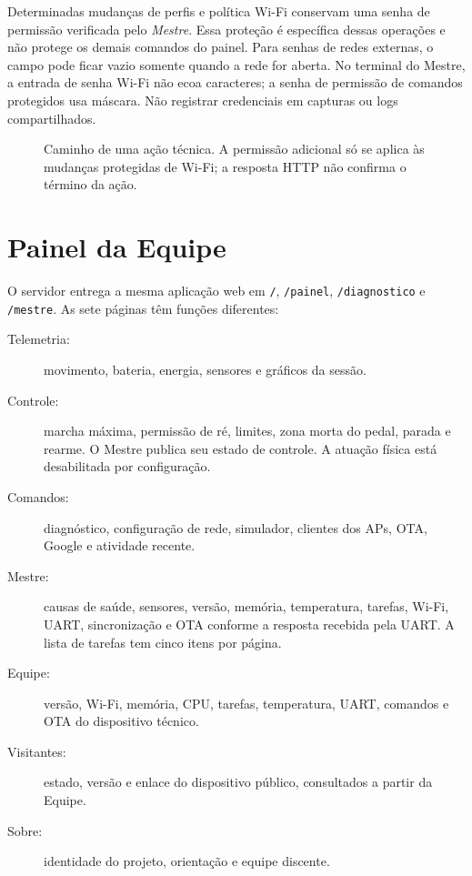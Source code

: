 Determinadas mudanças de perfis e política Wi-Fi conservam uma senha de permissão verificada pelo \emph{Mestre}. Essa proteção é específica dessas operações e não protege os demais comandos do painel. Para senhas de redes externas, o campo pode ficar vazio somente quando a rede for aberta. No terminal do Mestre, a entrada de senha Wi-Fi não ecoa caracteres; a senha de permissão de comandos protegidos usa máscara. Não registrar credenciais em capturas ou logs compartilhados.

\begin{figure}[htbp]\centering
{}
\caption{Caminho de uma ação técnica. A permissão adicional só se aplica às mudanças protegidas de Wi-Fi; a resposta HTTP não confirma o término da ação.}\label{fig:camadas-acesso}
\end{figure}

\section{Painel da Equipe}\label{sec:painel-equipe}
O servidor entrega a mesma aplicação web em \texttt{/}, \texttt{/painel}, \texttt{/diagnostico} e \texttt{/mestre}. As sete páginas têm funções diferentes:
\begin{description}
  \item[Telemetria:] movimento, bateria, energia, sensores e gráficos da sessão.
  \item[Controle:] marcha máxima, permissão de ré, limites, zona morta do pedal, parada e rearme. O Mestre publica seu estado de controle. A atuação física está desabilitada por configuração.
  \item[Comandos:] diagnóstico, configuração de rede, simulador, clientes dos APs, OTA, Google e atividade recente.
  \item[Mestre:] causas de saúde, sensores, versão, memória, temperatura, tarefas, Wi-Fi, UART, sincronização e OTA conforme a resposta recebida pela UART. A lista de tarefas tem cinco itens por página.
  \item[Equipe:] versão, Wi-Fi, memória, CPU, tarefas, temperatura, UART, comandos e OTA do dispositivo técnico.
  \item[Visitantes:] estado, versão e enlace do dispositivo público, consultados a partir da Equipe.
  \item[Sobre:] identidade do projeto, orientação e equipe discente.
\end{description}

